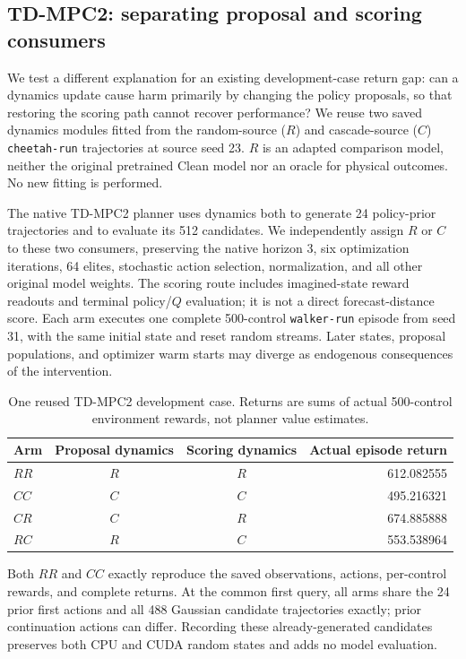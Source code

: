 \subsection{TD-MPC2: separating proposal and scoring consumers}
\label{sec:tdmpc-consumer-factorial}
We test a different explanation for an existing development-case return gap:
can a dynamics update cause harm primarily by changing the policy proposals,
so that restoring the scoring path cannot recover performance?
We reuse two saved dynamics modules fitted from the random-source ($R$) and
cascade-source ($C$) \texttt{cheetah-run} trajectories at source seed 23.
$R$ is an adapted comparison model, neither the original pretrained Clean
model nor an oracle for physical outcomes. No new fitting is performed.

The native TD-MPC2 planner uses dynamics both to generate 24 policy-prior
trajectories and to evaluate its 512 candidates. We independently assign
$R$ or $C$ to these two consumers, preserving the native horizon 3,
six optimization iterations, 64 elites, stochastic action selection,
normalization, and all other original model weights.
The scoring route includes imagined-state reward readouts and terminal
policy/$Q$ evaluation; it is not a direct forecast-distance score.
Each arm executes one complete 500-control \texttt{walker-run} episode from
seed 31, with the same initial state and reset random streams.
Later states, proposal populations, and optimizer warm starts may diverge
as endogenous consequences of the intervention.

\begin{table}[ht]
\centering
\begin{tabular}{lccr}
\toprule
Arm & Proposal dynamics & Scoring dynamics & Actual episode return \\
\midrule
$RR$ & $R$ & $R$ & 612.082555 \\
$CC$ & $C$ & $C$ & 495.216321 \\
$CR$ & $C$ & $R$ & 674.885888 \\
$RC$ & $R$ & $C$ & 553.538964 \\
\bottomrule
\end{tabular}
\caption{One reused TD-MPC2 development case. Returns are sums of actual
500-control environment rewards, not planner value estimates.}
\label{tab:tdmpc-consumer-factorial}
\end{table}

Both $RR$ and $CC$ exactly reproduce the saved observations, actions,
per-control rewards, and complete returns. At the common first query,
all arms share the 24 prior first actions and all 488 Gaussian candidate
trajectories exactly; prior continuation actions can differ. Recording these
already-generated candidates preserves both CPU and CUDA random states and
adds no model evaluation.


